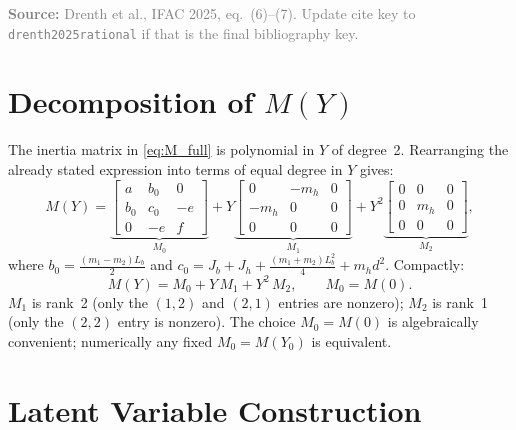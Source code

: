 \documentclass[11pt]{article}
\newcommand{\sourcenote}[1]{%
    \par\vspace{0.4em}%
    \textcolor{gray}{\footnotesize\textbf{Source:} #1}%
}
\begin{document}
\sourcenote{Drenth et al., IFAC 2025, eq.\ (6)--(7). Update cite key to
\texttt{drenth2025rational} if that is the final bibliography key.}

\section{Decomposition of \texorpdfstring{$M(Y)$}{M(Y)}}

The inertia matrix in \eqref{eq:M_full} is polynomial in $Y$ of degree~2.
Rearranging the already stated expression into terms of equal degree in $Y$ gives:
\begin{equation}
    M(Y) = \underbrace{\begin{bmatrix} a & b_0 & 0 \\ b_0 & c_0 & -e \\ 0 & -e & f \end{bmatrix}}_{M_0}
         + Y \underbrace{\begin{bmatrix} 0 & -m_h & 0 \\ -m_h & 0 & 0 \\ 0 & 0 & 0 \end{bmatrix}}_{M_1}
         + Y^2 \underbrace{\begin{bmatrix} 0 & 0 & 0 \\ 0 & m_h & 0 \\ 0 & 0 & 0 \end{bmatrix}}_{M_2},
    \label{eq:decomp}
\end{equation}
where $b_0 = \tfrac{(m_1-m_2)L_b}{2}$ and
$c_0 = J_b + J_h + \tfrac{(m_1+m_2)L_b^2}{4} + m_h d^2$.
Compactly:
\begin{equation}
    M(Y) = M_0 + Y\,M_1 + Y^2\,M_2, \qquad M_0 = M(0).
    \label{eq:decomp_short}
\end{equation}
$M_1$ is rank~2 (only the $(1,2)$ and $(2,1)$ entries are nonzero);
$M_2$ is rank~1 (only the $(2,2)$ entry is nonzero).
The choice $M_0 = M(0)$ is algebraically convenient; numerically any fixed
$M_0 = M(Y_0)$ is equivalent.

\section{Latent Variable Construction}
\end{document}
